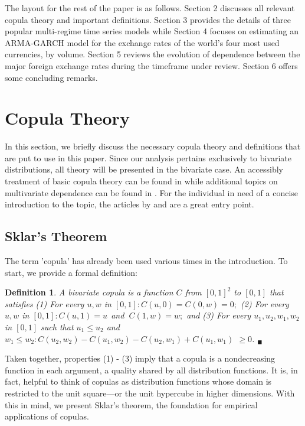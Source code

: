 \documentclass[12pt]{article}
\newtheorem{defn}{Definition}
\begin{document}
The layout for the rest of the paper is as follows. Section 2 discusses all relevant copula theory and important definitions. Section 3 provides the details of three popular multi-regime time series models while Section 4 focuses on estimating an ARMA-GARCH model for the exchange rates of the world's four most used currencies, by volume. Section 5 reviews the evolution of dependence between the major foreign exchange rates during the timeframe under review. Section 6 offers some concluding remarks.

\section{Copula Theory}

In this section, we briefly discuss the necessary copula theory and definitions that are put to use in this paper. Since our analysis pertains exclusively to bivariate distributions, all theory will be presented in the bivariate case. An accessibly treatment of basic copula theory can be found in \cite{Nelsen_2007} while additional topics on multivariate dependence can be found in \cite{Joe_1997}. For the individual in need of a concise introduction to the topic, the articles by \cite{Embrechts_et_al_2003} and \cite{Genest_and_Favre_2007} are a great entry point.

\subsection{Sklar's Theorem}

The term 'copula' has already been used various times in the introduction. To start, we provide a formal definition:

\begin{defn} \label{defn:copula}
	A bivariate copula is a function $C$ from $\left[0,1\right]^{2}$ to $\left[0,1\right]$ that satisfies (1) For every $u,w$ in $\left[0,1\right] :C\left(u,0\right) = C\left(0,w\right) = 0;$ (2) For every $u,w$ in $\left[0,1\right] :C\left(u,1\right) = u\ \ $and $\ C\left(1,w\right) = w;$ and (3) For every $u_{1}, u_{2}, w_{1}, w_{2}$ in $\left[0,1\right]$ such that $u_{1} \leq u_{2}$ and $w_{1} \leq w_{2}:C\left(u_{2}, w_{2}\right) - C\left(u_{1}, w_{2}\right) - C\left(u_{2}, w_{1}\right) + C\left(u_{1}, w_{1}\right)$ $\geq 0$. $_{\blacksquare}$
\end{defn}

Taken together, properties (1) - (3) imply that a copula is a nondecreasing function in each argument, a quality shared by all distribution functions. It is, in fact, helpful to think of copulas as distribution functions whose domain is restricted to the unit square---or the unit hypercube in higher dimensions. With this in mind, we present Sklar's theorem, the foundation for empirical applications of copulas.
\end{document}
